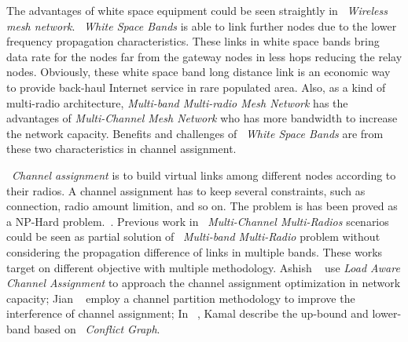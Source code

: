 The advantages of white space equipment could be seen straightly in ~\emph{Wireless mesh network}.
~\emph{White Space Bands} is able to link further nodes due to the lower frequency propagation characteristics.
These links in white space bands bring data rate for the nodes far from the gateway nodes in less hops reducing the relay nodes.
Obviously, these white space band long distance link is an economic way to provide back-haul Internet service in rare populated area.
Also, as a kind of multi-radio architecture, \emph{Multi-band Multi-radio Mesh Network} has the advantages of \emph{Multi-Channel Mesh Network} who has more bandwidth to increase the network capacity. 
Benefits and challenges of ~\emph{White Space Bands} are from these two characteristics in channel assignment. 

~\emph{Channel assignment} is to build virtual links among different nodes according to their radios. A channel assignment has to keep several constraints, such as connection, radio amount limition, and so on.
The problem is has been proved as a NP-Hard problem.~\cite{jain2005impact}. 
Previous work in ~\emph{Multi-Channel Multi-Radios} scenarios could be seen as partial solution of ~\emph{Multi-band Multi-Radio} problem without considering the propagation difference of links in multiple bands.
These works target on different objective with multiple methodology. Ashish ~\cite{raniwala2004centralized} use \emph{Load Aware Channel Assignment} to approach the channel assignment optimization in network capacity; Jian ~\cite{tang2005interference} employ a channel partition methodology to improve the interference of channel assignment; In ~\cite{jain2005impact}, Kamal describe the up-bound and lower-band based on ~\emph{Conflict Graph}.




